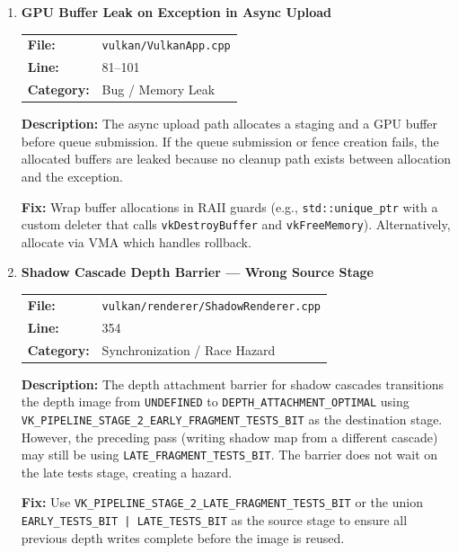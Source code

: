 \documentclass[a4paper,12pt]{article}
\newcommand{\severitybox}[2]{%
  \colorbox{#1}{\makebox[2.5cm][c]{\textcolor{white}{\textbf{#2}}}}%
}
\begin{document}
\begin{enumerate}[leftmargin=*]

\item[\textbf{[B3]}] \textbf{GPU Buffer Leak on Exception in Async Upload}
  \hfill \severitybox{highcolor}{HIGH}

  \begin{tabular}{ll}
    \textbf{File:} & \texttt{vulkan/VulkanApp.cpp} \\
    \textbf{Line:} & 81--101 \\
    \textbf{Category:} & Bug / Memory Leak \\
  \end{tabular}

  \textbf{Description:}
  The async upload path allocates a staging and a GPU buffer before queue submission.
  If the queue submission or fence creation fails, the allocated buffers are leaked
  because no cleanup path exists between allocation and the exception.

  \textbf{Fix:}
  Wrap buffer allocations in RAII guards (e.g., \texttt{std::unique\_ptr} with a
  custom deleter that calls \texttt{vkDestroyBuffer} and \texttt{vkFreeMemory}).
  Alternatively, allocate via VMA which handles rollback.

\item[\textbf{[S1]}] \textbf{Shadow Cascade Depth Barrier — Wrong Source Stage}
  \hfill \severitybox{highcolor}{HIGH}

  \begin{tabular}{ll}
    \textbf{File:} & \texttt{vulkan/renderer/ShadowRenderer.cpp} \\
    \textbf{Line:} & 354 \\
    \textbf{Category:} & Synchronization / Race Hazard \\
  \end{tabular}

  \textbf{Description:}
  The depth attachment barrier for shadow cascades transitions the depth image from
  \texttt{UNDEFINED} to \texttt{DEPTH\_ATTACHMENT\_OPTIMAL} using
  \texttt{VK\_PIPELINE\_STAGE\_2\_EARLY\_FRAGMENT\_TESTS\_BIT} as the destination
  stage. However, the preceding pass (writing shadow map from a different cascade)
  may still be using \texttt{LATE\_FRAGMENT\_TESTS\_BIT}. The barrier does not wait
  on the late tests stage, creating a hazard.

  \textbf{Fix:}
  Use \texttt{VK\_PIPELINE\_STAGE\_2\_LATE\_FRAGMENT\_TESTS\_BIT} or the union
  \texttt{EARLY\_TESTS\_BIT | LATE\_TESTS\_BIT} as the source stage to ensure all
  previous depth writes complete before the image is reused.


\end{enumerate}
\end{document}
